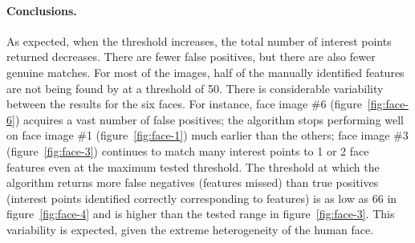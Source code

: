\paragraph{Conclusions.}
As expected, when the threshold increases, the total number of interest points returned decreases. There are fewer false positives, but there are also fewer genuine matches. For most of the images, half of the manually identified features are not being found by at a threshold of 50. There is considerable variability between the results for the six faces. For instance, face image \#6 (figure~\ref{fig:face-6}) acquires a vast number of false positives; the algorithm stops performing well on face image \#1 (figure~\ref{fig:face-1}) much earlier than the others; face image \#3 (figure~\ref{fig:face-3}) continues to match many interest points to 1 or 2 face features even at the maximum tested threshold. The threshold at which the algorithm returns more false negatives (features missed) than true positives (interest points identified correctly corresponding to features) is as low as 66 in figure~\ref{fig:face-4} and is higher than the tested range in figure~\ref{fig:face-3}. This variability is expected, given the extreme heterogeneity of the human face.
